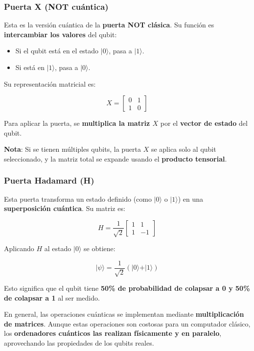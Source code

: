 \documentclass{article}
\begin{document}
\subsubsection*{Puerta X (NOT cuántica)}

Esta es la versión cuántica de la \textbf{puerta NOT clásica}. Su función es \textbf{intercambiar los valores} del qubit:

\begin{itemize}
    \item Si el qubit está en el estado $\vert 0 \rangle$, pasa a $\vert 1 \rangle$.
    \item Si está en $\vert 1 \rangle$, pasa a $\vert 0 \rangle$.
\end{itemize}

Su representación matricial es:

\[
X = \begin{bmatrix} 0 & 1 \\ 1 & 0 \end{bmatrix}
\]

Para aplicar la puerta, se \textbf{multiplica la matriz $X$} por el \textbf{vector de estado} del qubit.

\textbf{Nota}: Si se tienen múltiples qubits, la puerta $X$ se aplica solo al qubit seleccionado, y la matriz total se expande usando el \textbf{producto tensorial}.

\subsubsection*{Puerta Hadamard (H)}

Esta puerta transforma un estado definido (como $\vert 0 \rangle$ o $\vert 1 \rangle$) en una \textbf{superposición cuántica}. Su matriz es:

\[
H = \frac{1}{\sqrt{2}} \begin{bmatrix} 1 & 1 \\ 1 & -1 \end{bmatrix}
\]

Aplicando $H$ al estado $\vert 0 \rangle$ se obtiene:

\[
\vert \psi \rangle = \frac{1}{\sqrt{2}}(\vert 0 \rangle + \vert 1 \rangle)
\]

Esto significa que el qubit tiene \textbf{50\% de probabilidad de colapsar a 0 y 50\% de colapsar a 1} al ser medido.

En general, las operaciones cuánticas se implementan mediante \textbf{multiplicación de matrices}. Aunque estas operaciones son costosas para un computador clásico, los \textbf{ordenadores cuánticos las realizan físicamente y en paralelo}, aprovechando las propiedades de los qubits reales.
\end{document}
